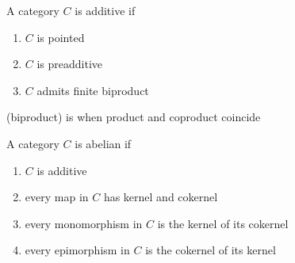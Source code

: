 \documentclass{article}
\begin{document}
\begin{definition}
    A category $C$ is additive if
    \begin{enumerate}
        \item $C$ is pointed
        \item $C$ is preadditive
        \item $C$ admits finite biproduct
    \end{enumerate}
    (biproduct) is when product and coproduct coincide
\end{definition}

\begin{definition}
    A category $C$ is abelian if
    \begin{enumerate}
        \item $C$ is additive
        \item every map in $C$ has kernel and cokernel
        \item every monomorphism in $C$ is the kernel of its cokernel
        \item every epimorphism in $C$ is the cokernel of its kernel
    \end{enumerate}
\end{definition}
\end{document}
